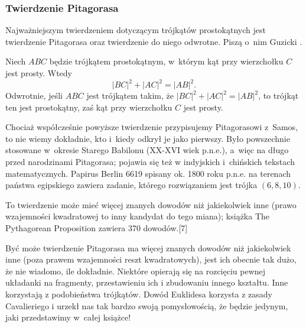 %

\subsubsection{Twierdzenie Pitagorasa}
Najważniejszym twierdzeniem dotyczącym trójkątów prostokątnych jest twierdzenie Pitagorasa oraz twierdzenie do niego odwrotne.
Piszą o~nim Guzicki \cite[s. 160]{guzicki_2021}.


\begin{theorem}[Pitagorasa]
%
\label{theorem_pythagorean}%
    Niech $ABC$ będzie trójkątem prostokątnym, w~którym kąt przy wierzchołku $C$ jest prosty.
    Wtedy
    \begin{equation}
        |BC|^2 + |AC|^2 = |AB|^2.
    \end{equation}
    Odwrotnie, jeśli $ABC$ jest trójkątem takim, że $|BC|^2 + |AC|^2 = |AB|^2$, to trójkąt ten jest prostokątny, zaś kąt przy wierzchołku $C$ jest prosty.
\end{theorem}

Chociaż współcześnie powyższe twierdzenie przypisujemy Pitagorasowi z~Samos, to nie wiemy dokładnie, kto i~kiedy odkrył je jako pierwszy.
%
Było powszechnie stosowane w~okresie Starego Babilonu (XX-XVI wiek p.n.e.), a~więc na długo przed narodzinami Pitagorasa; pojawia się też w indyjskich i~chińskich tekstach matematycznych.
Papirus Berlin 6619 spisany ok. 1800 roku p.n.e. na terenach państwa egipskiego zawiera zadanie, którego rozwiązaniem jest trójka $(6, 8, 10)$.

To twierdzenie może mieć więcej znanych dowodów niż jakiekolwiek inne (prawo wzajemności kwadratowej to inny kandydat do tego miana); książka The Pythagorean Proposition zawiera 370 dowodów.[7]

Być może twierdzenie Pitagorasa ma więcej znanych dowodów niż jakiekolwiek inne (poza prawem wzajemności reszt kwadratowych), jest ich obecnie tak dużo, że nie wiadomo, ile dokładnie.
Niektóre opierają się na rozcięciu pewnej układanki na fragmenty, przestawieniu ich i zbudowaniu innego kształtu.
Inne korzystają z podobieństwa trójkątów.
Dowód Euklidesa korzysta z zasady Cavalieriego i urzekł nas tak bardzo swoją pomysłowością, że będzie jedynym, jaki przedstawimy w~całej książce!

